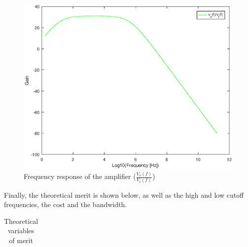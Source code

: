 \begin{figure}[H] 
	\centering
	\includegraphics[width=1\linewidth]{teoria.eps}
	\caption{Frequency response of the amplifier ($\frac{V_o(f)}{V_i(f)}$)}
\end{figure}

\par Finally, the theoretical merit is shown below, as well as the high and low cutoff frequencies, the cost and the bandwidth.

\vspace{5mm}
\begin{table}[H]
	\centering
	\begin{tabularx}{0.9\textwidth} {
 	    | >{\raggedright\arraybackslash}X
  	    | >{\raggedleft\arraybackslash}X | }
	\hline
	
	\end{tabularx}
	\caption{Theoretical variables of merit}
	\label{tab:merit1}
\end{table}
\vspace{5mm}

